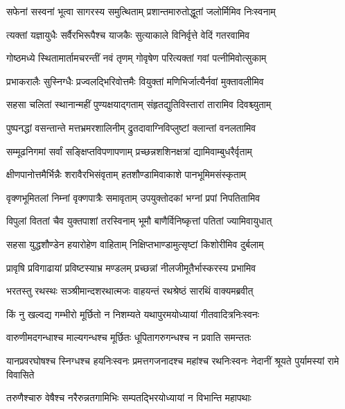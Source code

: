 \twolineshloka
{सफेनां सस्वनां भूत्वा सागरस्य समुत्थिताम्}
{प्रशान्तमारुतोद्धूतां जलोर्मिमिव निःस्वनाम्} %

\twolineshloka
{त्यक्तां यज्ञायुधैः सर्वैरभिरूपैश्च याजकैः}
{सुत्याकाले विनिर्वृत्ते वेदिं गतरवामिव} %

\twolineshloka
{गोष्ठमध्ये स्थितामार्तामचरन्तीं नवं तृणम्}
{गोवृषेण परित्यक्तां गवां पत्नीमिवोत्सुकाम्} %

\twolineshloka
{प्रभाकरालैः सुस्निग्धैः प्रज्वलद्भिरिवोत्तमैः}
{वियुक्तां मणिभिर्जात्यैर्नवां मुक्तावलीमिव} %

\twolineshloka
{सहसा चलितां स्थानान्महीं पुण्यक्षयाद्गताम्}
{संहृतद्युतिविस्तारां तारामिव दिवश्च्युताम्} %

\twolineshloka
{पुष्पनद्धां वसन्तान्ते मत्तभ्रमरशालिनीम्}
{द्रुतदावाग्निविप्लुष्टां क्लान्तां वनलतामिव} %

\twolineshloka
{सम्मूढनिगमां सर्वां सङ्क्षिप्तविपणापणाम्}
{प्रच्छन्नशशिनक्षत्रां द्यामिवाम्बुधरैर्वृताम्} %

\twolineshloka
{क्षीणपानोत्तमैर्भिन्नैः शरावैरभिसंवृताम्}
{हतशौण्डामिवाकाशे पानभूमिमसंस्कृताम्} %

\twolineshloka
{वृक्णभूमितलां निम्नां वृक्णपात्रैः समावृताम्}
{उपयुक्तोदकां भग्नां प्रपां निपतितामिव} %

\twolineshloka
{विपुलां विततां चैव युक्तपाशां तरस्विनाम्}
{भूमौ बाणैर्विनिष्कृत्तां पतितां ज्यामिवायुधात्} %

\twolineshloka
{सहसा युद्धशौण्डेन हयारोहेण वाहिताम्}
{निक्षिप्तभाण्डामुत्सृष्टां किशोरीमिव दुर्बलाम्} %

\twolineshloka
{प्रावृषि प्रविगाढायां प्रविष्टस्याभ्र मण्डलम्}
{प्रच्छन्नां नीलजीमूतैर्भास्करस्य प्रभामिव} %

\twolineshloka
{भरतस्तु रथस्थः सञ्श्रीमान्दशरथात्मजः}
{वाहयन्तं रथश्रेष्ठं सारथिं वाक्यमब्रवीत्} %

\twolineshloka
{किं नु खल्वद्य गम्भीरो मूर्छितो न निशम्यते}
{यथापुरमयोध्यायां गीतवादित्रनिःस्वनः} %

\twolineshloka
{वारुणीमदगन्धाश्च माल्यगन्धश्च मूर्छितः}
{धूपितागरुगन्धश्च न प्रवाति समन्ततः} %

\threelineshloka
{यानप्रवरघोषश्च स्निग्धश्च हयनिःस्वनः}
{प्रमत्तगजनादश्च महांश्च रथनिःस्वनः}
{नेदानीं श्रूयते पुर्यामस्यां रामे विवासिते} %

\twolineshloka
{तरुणैश्चारु वेषैश्च नरैरुन्नतगामिभिः}
{सम्पतद्भिरयोध्यायां न विभान्ति महापथाः} %

